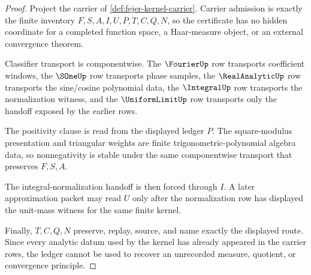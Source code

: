 \begin{proof}
Project the carrier of \autoref{def:fejer-kernel-carrier}. Carrier admission is exactly the finite inventory $F,S,A,I,U,P,T,C,Q,N$, so the certificate has no hidden coordinate for a completed function space, a Haar-measure object, or an external convergence theorem.

Classifier transport is componentwise. The $\FourierUp$ row transports coefficient windows, the $\SOneUp$ row transports phase samples, the $\RealAnalyticUp$ row transports the sine/cosine polynomial data, the $\IntegralUp$ row transports the normalization witness, and the $\UniformLimitUp$ row transports only the handoff exposed by the earlier rows.

The positivity clause is read from the displayed ledger $P$. The square-modulus presentation and triangular weights are finite trigonometric-polynomial algebra data, so nonnegativity is stable under the same componentwise transport that preserves $F,S,A$.

The integral-normalization handoff is then forced through $I$. A later approximation packet may read $U$ only after the normalization row has displayed the unit-mass witness for the same finite kernel.

Finally, $T,C,Q,N$ preserve, replay, source, and name exactly the displayed route. Since every analytic datum used by the kernel has already appeared in the carrier rows, the ledger cannot be used to recover an unrecorded measure, quotient, or convergence principle.
\end{proof}





